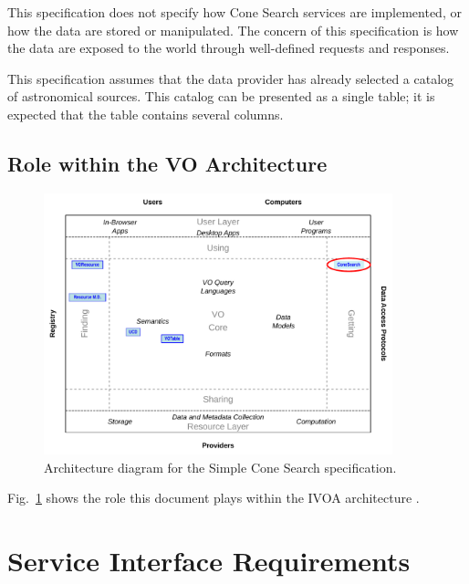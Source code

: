 \documentclass[11pt,a4paper]{ivoa}
\begin{document}
This specification does not specify how Cone Search services are
implemented, or how the data are stored or manipulated. The concern of
this specification is how the data are exposed to the world through
well-defined requests and responses.

This specification assumes that the data provider has already selected a
catalog of astronomical sources. This catalog can be presented as a
single table; it is expected that the table contains several columns.

\subsection{Role within the VO Architecture}

\begin{figure} \centering
\includegraphics[width=0.9\textwidth]{role_diagram}
\caption{Architecture diagram for the Simple Cone Search
specification.}
\label{fig:archdiag} 
\end{figure}

Fig.~\ref{fig:archdiag} shows the role this document plays within the
IVOA architecture \citep{2021ivoa.spec.1101D}.

\section{Service Interface Requirements}
\label{sec:2}
\end{document}
